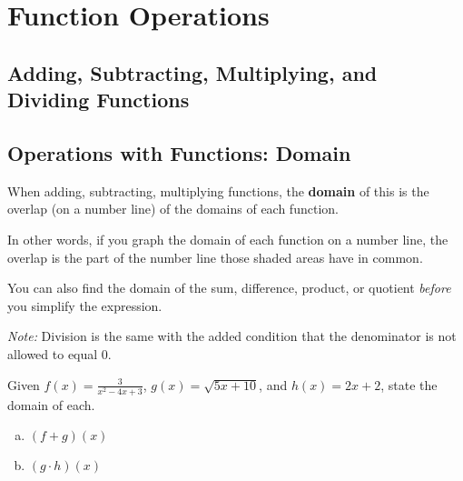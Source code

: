 \chapter{Function Operations}

\section{Adding, Subtracting, Multiplying, and Dividing Functions}

\section{Operations with Functions: Domain}

When adding, subtracting, multiplying functions, the {\color{red}\textbf{domain}} of this is the overlap (on a number line) of the domains of each function. \newline 

In other words, if you graph the domain of each function on a number line, the overlap is the part of the number line those shaded areas have in common. \newline 

You can also find the domain of the sum, difference, product, or quotient \emph{before} you simplify the expression. \newline 

\emph{Note:} Division is the same with the added condition that the denominator is not allowed to equal 0. 

\begin{example}
Given $f(x) = \frac{3}{x^2-4x+3}$, $g(x) = \sqrt{5x+10}$, and $h(x) = 2x+2$, state the domain of each.
\begin{multicols}{2}
\begin{enumerate}[(a)]
    \item $(f + g)(x)$
    \item $(g \cdot h)(x)$
\end{enumerate}
\end{multicols}
\end{example}


